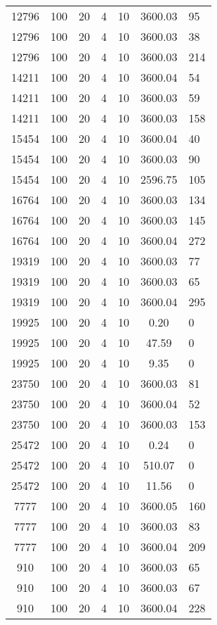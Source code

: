 \begin{tabular}[center]{cccccc}
12796   & 100 & 20 & 4 & 10 & 3600.03 & 95  \\
12796   & 100 & 20 & 4 & 10 & 3600.03 & 38  \\
12796   & 100 & 20 & 4 & 10 & 3600.03 & 214 \\
14211   & 100 & 20 & 4 & 10 & 3600.04 & 54  \\
14211   & 100 & 20 & 4 & 10 & 3600.03 & 59  \\
14211   & 100 & 20 & 4 & 10 & 3600.03 & 158 \\
15454   & 100 & 20 & 4 & 10 & 3600.04 & 40  \\
15454   & 100 & 20 & 4 & 10 & 3600.03 & 90  \\
15454   & 100 & 20 & 4 & 10 & 2596.75 & 105 \\
16764   & 100 & 20 & 4 & 10 & 3600.03 & 134 \\
16764   & 100 & 20 & 4 & 10 & 3600.03 & 145 \\
16764   & 100 & 20 & 4 & 10 & 3600.04 & 272 \\
19319   & 100 & 20 & 4 & 10 & 3600.03 & 77  \\
19319   & 100 & 20 & 4 & 10 & 3600.03 & 65  \\
19319   & 100 & 20 & 4 & 10 & 3600.04 & 295 \\
19925   & 100 & 20 & 4 & 10 & 0.20    & 0   \\
19925   & 100 & 20 & 4 & 10 & 47.59   & 0   \\
19925   & 100 & 20 & 4 & 10 & 9.35    & 0   \\
23750   & 100 & 20 & 4 & 10 & 3600.03 & 81  \\
23750   & 100 & 20 & 4 & 10 & 3600.04 & 52  \\
23750   & 100 & 20 & 4 & 10 & 3600.03 & 153 \\
25472   & 100 & 20 & 4 & 10 & 0.24    & 0   \\
25472   & 100 & 20 & 4 & 10 & 510.07  & 0   \\
25472   & 100 & 20 & 4 & 10 & 11.56   & 0   \\
7777    & 100 & 20 & 4 & 10 & 3600.05 & 160 \\
7777    & 100 & 20 & 4 & 10 & 3600.03 & 83  \\
7777    & 100 & 20 & 4 & 10 & 3600.04 & 209 \\
910     & 100 & 20 & 4 & 10 & 3600.03 & 65  \\
910     & 100 & 20 & 4 & 10 & 3600.03 & 67  \\
910     & 100 & 20 & 4 & 10 & 3600.04 & 228 \\

\end{tabular}
